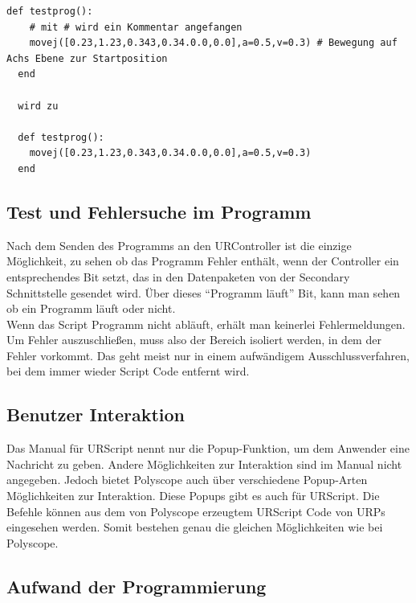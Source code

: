 \begin{lstlisting}[caption={Beispiel-Kommentare vor und nach dem Pre-Prozessor}, label=lst:urscipt_comment_lst ,captionpos=b]
  def testprog():
    # mit # wird ein Kommentar angefangen
    movej([0.23,1.23,0.343,0.34.0.0,0.0],a=0.5,v=0.3) # Bewegung auf Achs Ebene zur Startposition
  end

  wird zu 

  def testprog():
    movej([0.23,1.23,0.343,0.34.0.0,0.0],a=0.5,v=0.3)
  end

\end{lstlisting}

\subsection{Test und Fehlersuche im Programm}
\label{ur_script_debuggen}

Nach dem Senden des Programms an den URController ist die einzige Möglichkeit, zu sehen ob das Programm Fehler enthält, wenn der Controller ein entsprechendes Bit setzt, das in den Datenpaketen von der Secondary Schnittstelle gesendet wird. Über dieses ``Programm läuft'' Bit, kann man sehen ob ein Programm läuft oder nicht.
\\
Wenn das Script Programm nicht abläuft, erhält man keinerlei Fehlermeldungen. Um Fehler auszuschließen, muss also der Bereich isoliert werden, in dem der Fehler vorkommt. Das geht meist nur in einem aufwändigem Ausschlussverfahren, bei dem immer wieder Script Code entfernt wird.

\subsection{Benutzer Interaktion}
\label{ur_script_user_interaction}

Das Manual für URScript nennt nur die Popup-Funktion, um dem Anwender eine Nachricht zu geben. Andere Möglichkeiten zur Interaktion sind im Manual nicht angegeben. Jedoch bietet Polyscope auch über verschiedene Popup-Arten Möglichkeiten zur Interaktion. Diese Popups gibt es auch für URScript. Die Befehle können aus dem von Polyscope erzeugtem URScript Code von \ac{URP}s eingesehen werden. Somit bestehen genau die gleichen Möglichkeiten wie bei Polyscope.

\subsection{Aufwand der Programmierung}
\label{ur_script_aufwand}

